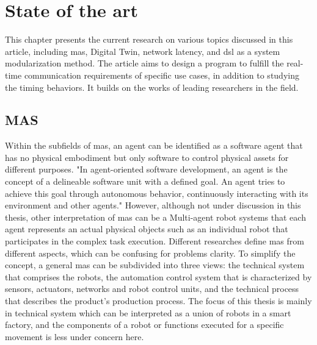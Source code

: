 \chapter{State of the art}%
This chapter presents the current research on various topics discussed 
in this article, including \gls{mas}, Digital Twin, network latency, 
and \gls{dsl} as a system modularization method. The article aims to 
design a program to fulfill the real-time communication requirements 
of specific use cases, in addition to studying the timing behaviors. 
It builds on the works of leading researchers in the field.

\section{MAS}

Within the subfields of \gls{mas}, an agent can be identified as a software agent that has no physical embodiment but only software to control physical assets for different purposes. "In agent-oriented software development, an agent is the concept of a delineable software unit with a defined goal. An agent tries to achieve this goal through autonomous behavior, continuously interacting with its environment and other agents." \cite{wagner_agentenunterstutztes_2008} However, although not under discussion in this thesis, other interpretation of \gls{mas} can be a Multi-agent robot systems that each agent represents an actual physical objects such as an individual robot that participates in the complex task execution. \cite{ota_multi-agent_2006}   
Different researches define \gls{mas} from different aspects, which can be confusing for problems clarity. To simplify the concept, a general \gls{mas} can be subdivided into three views: the technical system that comprises the robots, the automation control system that is characterized by sensors, actuators, networks and robot control units, and the technical process that describes the product's production process.\cite{lauber_prozessautomatisierung_1999} \cite{wannagat_agent_nodate}The focus of this thesis is mainly in technical system which can be interpreted as a union of robots in a smart factory, and the components of a robot or functions executed for a specific movement is less under concern here. 


